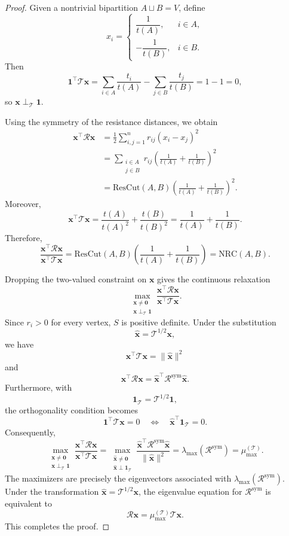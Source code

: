\documentclass[12pt,a4paper]{amsart}
\theoremstyle{remark}
\theoremstyle{definition}
\newcommand{\Rs}{\mathcal{R}}
\newcommand{\1}{\mathbf{1}}
\newcommand{\0}{\mathbf{0}}
\newcommand{\bx}{\mathbf{x}}
\begin{document}
\begin{proof}
Given a nontrivial bipartition
$A\sqcup B=V$, define
\[
x_i=
\begin{cases}
\dfrac{1}{t(A)}, & i\in A,\\[2mm]
-\dfrac{1}{t(B)}, & i\in B.
\end{cases}
\]
Then
\[
\mathbf{1}^\top \mathcal{T}\bx = \sum_{i\in A}\frac{t_i}{t(A)} - \sum_{j\in B}\frac{t_j}{t(B)} = 1-1 = 0,
\]
so $\bx\perp_{\mathcal{T}}\mathbf{1}$.

Using the symmetry of the resistance distances, we obtain
\begin{align*}
\bx^\top\Rs\bx
&= \frac{1}{2} \sum_{i,j=1}^{n}r_{ij}(x_i-x_j)^2\\ 
&= \sum_{\substack{i\in A\\j\in B}} r_{ij}
\left(
\frac{1}{t(A)}+\frac{1}{t(B)}
\right)^2\\
&=
\mathrm{ResCut}(A,B)
\left(
\frac{1}{t(A)}+\frac{1}{t(B)}
\right)^2.
\end{align*}
Moreover,
\[
\bx^\top \mathcal{T}\bx
=
\frac{t(A)}{t(A)^2}
+
\frac{t(B)}{t(B)^2}
=
\frac{1}{t(A)}+\frac{1}{t(B)}.
\]
Therefore,
\[
\frac{\bx^\top\Rs\bx}{\bx^\top \mathcal{T}\bx}
=
\mathrm{ResCut}(A,B)
\left(
\frac{1}{t(A)}+\frac{1}{t(B)}
\right)
=
\mathrm{NRC}(A,B).
\]

Dropping the two-valued constraint on $\bx$ gives the continuous
relaxation
\[
\max_{\substack{\bx\neq\mathbf{0}\\
\bx\perp_{\mathcal{T}}\mathbf{1}}}
\frac{\bx^\top\Rs\bx}{\bx^\top \mathcal{T}\bx}.
\]
Since $r_i>0$ for every vertex, $S$ is positive definite. Under the
substitution
\[
\widehat{\bx}=\mathcal{T}^{1/2}\bx,
\]
we have
\[
\bx^\top \mathcal{T}\bx=\|\widehat{\bx}\|^2
\]
and
\[
\bx^\top\Rs\bx
=
\widehat{\bx}^{\top}
\Rs^{\mathrm{sym}}
\widehat{\bx}.
\]
Furthermore, with
\[
\mathbf{1}_{\mathcal{T}}=\mathcal{T}^{1/2}\mathbf{1},
\]
the orthogonality condition becomes
\[
\mathbf{1}^\top \mathcal{T}\bx=0
\quad\Longleftrightarrow\quad
\widehat{\bx}^{\top}\mathbf{1}_{\mathcal{T}}=0.
\]
Consequently,
\[
\max_{\substack{\bx\neq\mathbf{0}\\
\bx\perp_\mathcal{T}\mathbf{1}}}
\frac{\bx^\top\Rs\bx}{\bx^\top \mathcal{T}\bx}
=
\max_{\substack{\widehat{\bx}\neq\mathbf{0}\\
\widehat{\bx}\perp\mathbf{1}_{\mathcal{T}}}}
\frac{
\widehat{\bx}^{\top}
\Rs^{\mathrm{sym}}
\widehat{\bx}
}{
\|\widehat{\bx}\|^2
}
=
\lambda_{\max}\!\left(\Rs^{\mathrm{sym}}\right)
=
\mu_{\max}^{(\mathcal{T})}.
\]
The maximizers are precisely the eigenvectors associated with
$\lambda_{\max}(\Rs^{\mathrm{sym}})$. Under the transformation
$\widehat{\bx}=\mathcal{T}^{1/2}\bx$, the eigenvalue equation for
$\Rs^{\mathrm{sym}}$ is equivalent to
\[
\Rs\bx=\mu_{\max}^{(\mathcal{T})}\mathcal{T}\bx.
\]
This completes the proof.
\end{proof}
\end{document}
